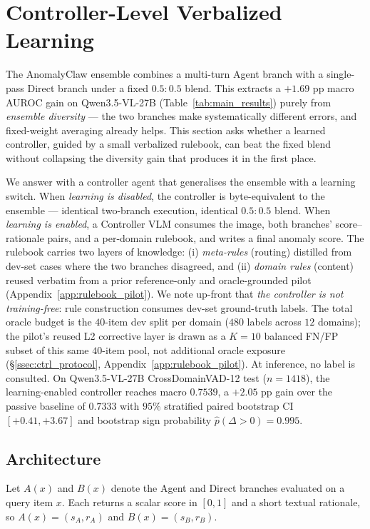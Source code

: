 \section{Controller-Level Verbalized Learning}
\label{sec:controller}

The AnomalyClaw ensemble combines a multi-turn Agent branch with a
single-pass Direct branch under a fixed $0.5{:}0.5$ blend. This
extracts a $+1.69$ pp macro AUROC gain on Qwen3.5-VL-27B
(Table~\ref{tab:main_results}) purely from \emph{ensemble diversity}
--- the two branches make systematically different errors, and
fixed-weight averaging already helps. This section asks whether a
learned controller, guided by a small verbalized rulebook, can beat
the fixed blend without collapsing the diversity gain that produces
it in the first place.

We answer with a controller agent that generalises the ensemble with a learning
switch. When \emph{learning is disabled}, the controller is byte-equivalent to
the ensemble --- identical two-branch execution, identical $0.5{:}0.5$
blend. When \emph{learning is enabled}, a Controller VLM consumes
the image, both branches' score--rationale pairs, and a per-domain
rulebook, and writes a final anomaly score. The rulebook carries two
layers of knowledge: (i) \emph{meta-rules} (routing) distilled from
dev-set cases where the two branches disagreed, and (ii)
\emph{domain rules} (content) reused verbatim from a prior reference-only
and oracle-grounded pilot (Appendix~\ref{app:rulebook_pilot}). We note
up-front that \emph{the controller is not training-free}: rule construction consumes
dev-set ground-truth labels. The total oracle budget is the $40$-item
dev split per domain ($480$ labels across $12$ domains); the
pilot's reused L2 corrective layer is drawn as a $K{=}10$ balanced
FN/FP subset of this same $40$-item pool, not additional oracle
exposure (\S\ref{ssec:ctrl_protocol}, Appendix~\ref{app:rulebook_pilot}).
At inference, no label is consulted. On Qwen3.5-VL-27B CrossDomainVAD-12
test ($n{=}1418$), the learning-enabled controller reaches macro $0.7539$,
a $+2.05$ pp gain over the passive baseline of $0.7333$ with $95\%$
stratified paired bootstrap CI $[+0.41, +3.67]$ and bootstrap sign
probability $\hat{p}(\Delta{>}0) = 0.995$.

\subsection{Architecture}
\label{ssec:ctrl_arch}

Let $A(x)$ and $B(x)$ denote the Agent and Direct branches evaluated
on a query item $x$. Each returns a scalar score in $[0, 1]$ and a
short textual rationale, so $A(x) = (s_A, r_A)$ and $B(x) = (s_B,
r_B)$.

